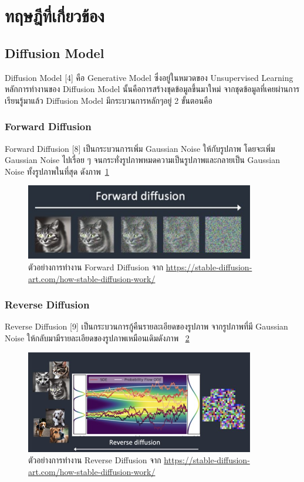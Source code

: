 \documentclass[12pt,oneside,openright,a4paper]{cpe-thai-project}
\begin{document}
\section{ทฤษฎีที่เกี่ยวข้อง}

\subsection{Diffusion Model}
\hspace {18pt}Diffusion Model [4] คือ Generative Model ซึ่งอยู่ในหมวดของ Unsupervised Learning
หลักการทำงานของ Diffusion Model นั้นคือการสร้างชุดข้อมูลขึ้นมาใหม่ จากชุดข้อมูลที่เคยผ่านการเรียนรู้มาแล้ว Diffusion Model มีกระบวนการหลักๆอยู่ 2 ขั้นตอนคือ

\subsubsection{Forward Diffusion}
\hspace {18pt} Forward Diffusion [8] เป็นกระบวนการเพิ่ม Gaussian Noise ให้กับรูปภาพ โดยจะเพิ่ม Gaussian Noise ไปเรื่อย ๆ จนกระทั่งรูปภาพหมดความเป็นรูปภาพและกลายเป็น Gaussian Noise ทั้งรูปภาพในที่สุด ดังภาพ~\ref{fig:forward}

\begin{figure}[!h]\centering
\includegraphics[width=10cm]{image/forward.jpg}
\caption{ตัวอย่างการทำงาน Forward Diffusion จาก \url{https://stable-diffusion-art.com/how-stable-diffusion-work/}}
\label{fig:forward}
\end{figure}

\subsubsection{Reverse Diffusion}
\hspace {18pt} Reverse Diffusion [9] เป็นกระบวนการกู้คืนรายละเอียดของรูปภาพ จากรูปภาพที่มี Gaussian Noise ให้กลับมามีรายละเอียดของรูปภาพเหมือนเดิมดังภาพ ~\ref{fig:reverse}

\begin{figure}[!h]\centering
\includegraphics[width=10cm]{image/reverse.jpg}
\caption{ตัวอย่างการทำงาน Reverse Diffusion จาก \url{https://stable-diffusion-art.com/how-stable-diffusion-work/}}
\label{fig:reverse}
\end{figure}
\end{document}

